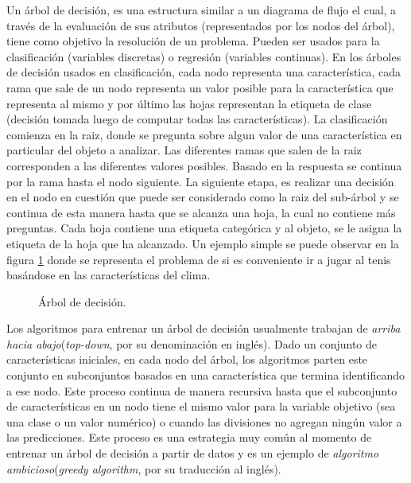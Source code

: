 	Un árbol de decisión, es una estructura similar a un diagrama de flujo el cual, a través de la evaluación de sus atributos (representados por los nodos del árbol), tiene como objetivo la resolución de un problema. Pueden ser usados para la clasificación (variables discretas) o regresión (variables continuas). En los árboles de decisión usados en clasificación, cada nodo representa una característica, cada rama que sale de un nodo representa un valor posible para la característica que representa al mismo y por último las hojas representan la etiqueta de clase (decisión tomada luego de computar todas las características). La clasificación comienza en la raiz, donde se pregunta sobre algun valor de una característica en particular del objeto a analizar. Las diferentes ramas que salen de la  raiz corresponden a las diferentes valores posibles. Basado en la respuesta se continua por la rama hasta el nodo siguiente. La siguiente etapa, es realizar una decisión en el nodo en cuestión que puede ser considerado como la raiz del sub-árbol y se continua de esta manera hasta que se alcanza una hoja, la cual no contiene más preguntas. Cada hoja contiene una etiqueta categórica y al objeto, se le asigna la etiqueta de la hoja que ha alcanzado. Un ejemplo simple se puede observar en la figura \ref{fig: Arbol de decision} donde se representa el problema de si es conveniente ir a jugar al tenis basándose en las características del clima.
		\begin{figure}[htbp]
			\centering
			\caption{Árbol de decisión.}
			\label{fig: Arbol de decision}
		\end{figure}
		
	Los algoritmos para entrenar un árbol de decisión usualmente trabajan de \textit{arriba hacia abajo}(\textit{top-down}, por su denominación en inglés). Dado un conjunto de características iniciales, en cada nodo del árbol, los algoritmos parten este conjunto en subconjuntos basados en una característica que termina identificando a ese nodo. Este proceso continua de manera recursiva hasta que el subconjunto de características en un nodo tiene el mismo valor para la variable objetivo (sea una clase o un valor numérico) o cuando las divisiones no agregan ningún valor a las predicciones. Este proceso es una estrategia muy común al momento de entrenar un árbol de decisión a partir de datos y es un ejemplo de \textit{algoritmo ambicioso}(\textit{greedy algorithm}, por su traducción al inglés).
	
